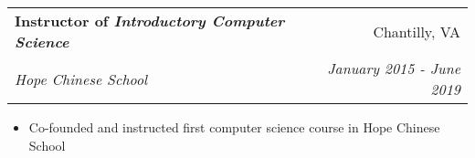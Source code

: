 \documentclass[letterpaper,11pt]{article}
\makeatletter
\newcommand{\resitem}[1]{\item #1 \vspace{-2pt}}
\newcommand{\ressubheading}[4]{
\begin{tabular*}{7.0in}{l@{\extracolsep{\fill}}r}
		\textbf{#1} & #2 \\
		\textit{#3} & \textit{#4} \\
\end{tabular*}\vspace{-6pt}}
\makeatother
\begin{document}
\begin{itemize}
	\ressubheading{Instructor of \textit{Introductory Computer Science}}{Chantilly, VA}{Hope Chinese School}{January 2015 - June 2019}
	\begin{itemize}
	    \resitem{Co-founded and instructed first computer science course in Hope Chinese School}
	\end{itemize}
\end{itemize}
\end{document}
